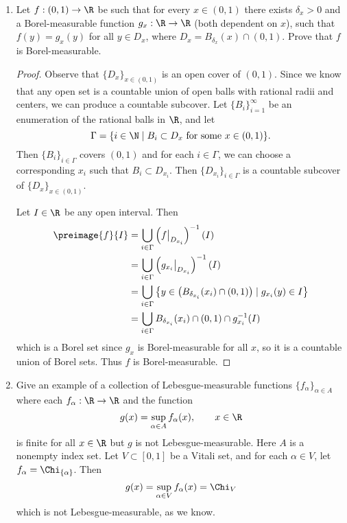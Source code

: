 \documentclass[12pt,letterpaper]{article}
\begin{document}
\begin{enumerate}
\pagebreak
\item Let $f:(0,1)\to\R$ be such that for every $x\in (0,1)$ there exists $\delta_x>0$ and a Borel-measurable function $g_x:\R\to\R$ (both dependent on $x$), such that $f(y)=g_x(y)$ for all $y\in D_x$, where $D_x=B_{\delta_x}(x)\cap (0,1)$. Prove that $f$ is Borel-measurable. 
\begin{proof}
Observe that $\{D_x\}_{x\in(0,1)}$ is an open cover of $(0,1)$. Since we know that any open set is a countable union of open balls with rational radii and centers, we can produce a countable subcover. Let $\{B_i\}_{i=1}^\infty$ be an enumeration of the rational balls in $\R$, and let 
$$\Gamma=\{i\in\N \mid B_i\subset D_x \text{ for some } x\in(0,1)\}.$$
Then $\{B_i\}_{i\in\Gamma}$ covers $(0,1)$ and for each $i\in\Gamma$, we can choose a corresponding $x_i$ such that $B_i\subset D_{x_i}$. Then 
$\{D_{x_i}\}_{i\in\Gamma}$
is a countable subcover of $\{D_x\}_{x\in(0,1)}$. 

Let $I\in\R$ be any open interval. Then 
\begin{align*}
\preimage{f}{I}&=\bigcup_{i\in\Gamma}\left(f\big|_{D_{x_i}}\right)^{-1}(I)\\
&=\bigcup_{i\in\Gamma}\left(g_{x_i}\big|_{D_{x_i}}\right)^{-1}(I)\\
&=\bigcup_{i\in\Gamma}\left\lbrace y\in \big(B_{\delta_{x_i}}({x_i})\cap (0,1)\big) \mid g_{x_i}(y)\in I\right\rbrace\\
&=\bigcup_{i\in\Gamma} B_{\delta_{x_i}}({x_i})\cap (0,1) \cap g^{-1}_{x_i}(I)\\
\end{align*}
which is a Borel set since $g_x$ is Borel-measurable for all $x$, so it is a countable union of Borel sets. Thus $f$ is Borel-measurable.
\end{proof}

\item Give an example of a collection of Lebesgue-measurable functions $\{f_\alpha\}_{\alpha\in A}$ where each \linebreak $f_\alpha:\R\to\R$ and the function
$$g(x)=\sup_{\alpha\in A} f_\alpha(x), \quad \quad x\in\R$$
is finite for all $x\in\R$ but $g$ is not Lebesgue-measurable. Here $A$ is a nonempty index set. 
\answer Let $V\subset[0,1]$ be a Vitali set, and for each $\alpha\in V$, let $f_\alpha=\Chi_{\{\alpha\}}$. Then 
$$g(x)=\sup_{\alpha\in V} f_\alpha(x)=\Chi_V$$
which is not Lebesgue-measurable, as we know. 


\end{enumerate}
\end{document}
